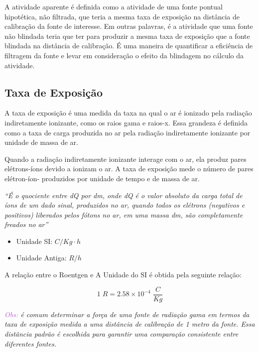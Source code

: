 \documentclass[11pt,a4paper]{article}
\begin{document}
	A atividade aparente é definida como a atividade de uma fonte pontual hipotética, não filtrada, que teria a mesma taxa de exposição na distância de calibração da fonte de interesse. Em outras palavras, é a atividade que uma fonte não blindada teria que ter para produzir a mesma taxa de exposição que a fonte blindada na distância de calibração. É uma maneira de quantificar a eficiência de filtragem da fonte e levar em consideração o efeito da blindagem no cálculo da atividade.
	
		
\subsection*{Taxa de Exposição}

	A taxa de exposição é uma medida da taxa na qual o ar é ionizado pela radiação indiretamente ionizante, como os raios gama e raios-x. Essa grandeza é definida como a taxa de carga produzida no ar pela radiação indiretamente ionizante por unidade de massa de ar.

	Quando a radiação indiretamente ionizante interage com o ar, ela produz pares elétrons-íons devido a ionizam o ar. A taxa de exposição mede o número de pares elétron-íon- produzidos por unidade de tempo e de massa de ar.

		\textit{``É o quociente entre dQ por dm, onde dQ é o valor absoluto da carga total de íons de um dado sinal, produzidos no ar, quando todos os elétrons (negativos e positivos) liberados pelos fótons no ar, em uma massa dm, são completamente freados no ar''}
		
		

			\begin{itemize}
				\item Unidade SI: $C/Kg\cdot h$
				\item Unidade Antiga: $R / h$
			\end{itemize}

			A relação entre o Roentgen e A Unidade do SI é obtida pela seguinte relação:

			\begin{equation}
				1\;R = 2.58 \times 10^{-4}\; \frac{C}{Kg}
			\end{equation}

			\textit{\textcolor{MediumOrchid}{Obs:}  é comum determinar a força de uma fonte de radiação gama em termos da taxa de exposição medida a uma distância de calibração de 1 metro da fonte. Essa distância padrão é escolhida para garantir uma comparação consistente entre diferentes fontes.}
\end{document}
